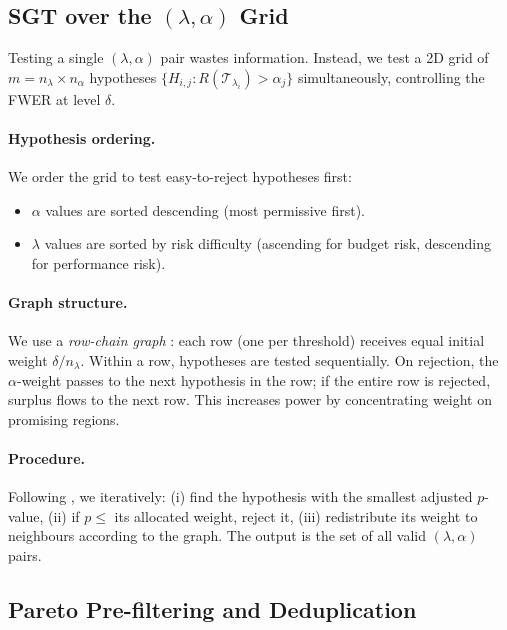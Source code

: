 \documentclass{article}
\begin{document}
\subsection{SGT over the $(\lambda, \alpha)$ Grid}
\label{sec:sgt}

Testing a single $(\lambda, \alpha)$ pair wastes information. Instead, we test a 2D grid of $m = n_\lambda \times n_\alpha$ hypotheses $\{H_{i,j}: R(\mathcal{T}_{\lambda_i}) > \alpha_j\}$ simultaneously, controlling the FWER at level $\delta$.

\paragraph{Hypothesis ordering.}
We order the grid to test easy-to-reject hypotheses first:
\begin{itemize}
    \item $\alpha$ values are sorted descending (most permissive first).
    \item $\lambda$ values are sorted by risk difficulty (ascending for budget risk, descending for performance risk).
\end{itemize}

\paragraph{Graph structure.}
We use a \emph{row-chain graph} \citep{angelopoulos_learn_2022}: each row (one per threshold) receives equal initial weight $\delta/n_\lambda$. Within a row, hypotheses are tested sequentially. On rejection, the $\alpha$-weight passes to the next hypothesis in the row; if the entire row is rejected, surplus flows to the next row. This increases power by concentrating weight on promising regions.

\paragraph{Procedure.}
Following \citet{angelopoulos_learn_2022}, we iteratively: (i) find the hypothesis with the smallest adjusted $p$-value, (ii) if $p \leq$ its allocated weight, reject it, (iii) redistribute its weight to neighbours according to the graph.
The output is the set of all valid $(\lambda, \alpha)$ pairs.


\subsection{Pareto Pre-filtering and Deduplication}
\label{sec:pareto}
\end{document}
